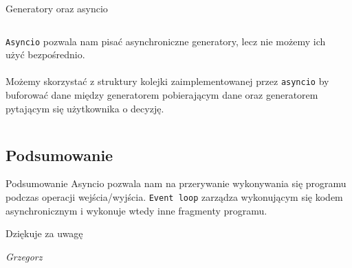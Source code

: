 \documentclass[aspectratio=169]{beamer}
\begin{document}
\begin{frame}[fragile]{Generatory oraz asyncio}
  \begin{columns}
    \begin{column}{.48 \textwidth}
      \texttt{Asyncio} pozwala nam pisać asynchroniczne generatory, lecz 
      nie możemy ich użyć bezpośrednio. \\~\\

      Możemy skorzystać z struktury kolejki zaimplementowanej przez
      \texttt{asyncio} by buforować dane między generatorem pobierającym dane 
      oraz generatorem pytającym się użytkownika o decyzję.
    \end{column}

    \begin{column}{.48 \textwidth}
      \tiny
      \vspace{-10mm}
      \inputminted[linenos]{python}{./examples/asyncQueue.py}
    \end{column}
  \end{columns}
\end{frame}

\subsection{Podsumowanie}
\begin{frame}{Podsumowanie}
  Asyncio pozwala nam na przerywanie wykonywania się programu podczas operacji 
  wejścia/wyjścia. \texttt{Event loop} zarządza wykonującym się kodem
  asynchronicznym i wykonuje wtedy inne fragmenty programu.
\end{frame}

\begin{frame}

  \vspace{3cm}

  \begin{center}
  Dziękuje za uwagę\\
  \end{center}
  
  \vspace{3cm}

  \begin{flushright}
    \scriptsize{
      \emph{Grzegorz \color{stxgreen}{Koperwas}}
    }
  \end{flushright}
\end{frame}

\lastframe
\end{document}
